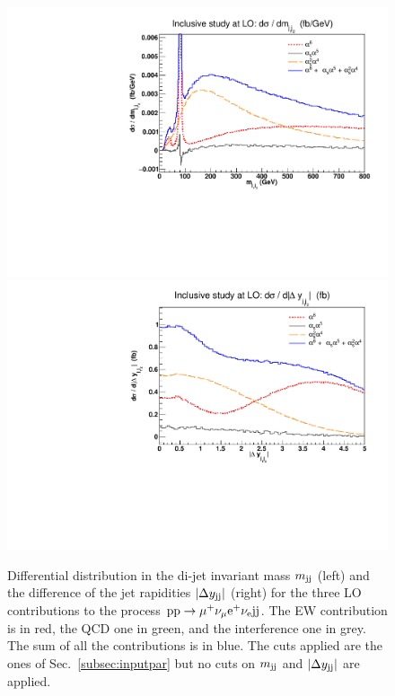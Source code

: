 \begin{figure}[hbt]
\centering
\includegraphics[scale=0.395]{figures/scanfigures/mjj_full.pdf}
\includegraphics[scale=0.395]{figures/scanfigures/dyjj_full.pdf}
\caption{Differential distribution in the di-jet invariant mass $m_{\text{j}\text{j}}$ (left) and the difference of the jet rapidities $|\Delta y_{\text{j}\text{j}}|$ (right) for the three LO contributions to the process ${\rm p}{\rm p}\to\mu^+\nu_\mu{\rm e}^+\nu_{\rm e}{\rm j}{\rm j}$.
The EW contribution is in red, the QCD one in green, and the interference one in grey.
The sum of all the contributions is in blue.
The cuts applied are the ones of Sec.~\ref{subsec:inputpar} but no cuts on $m_{\text{j}\text{j}}$ and $|\Delta y_{\text{j}\text{j}}|$ are applied.}
\label{fig:mjjdyjj_1d}
\end{figure}

